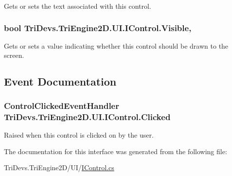 Gets or sets the text associated with this control. 

\hypertarget{interface_tri_devs_1_1_tri_engine2_d_1_1_u_i_1_1_i_control_ac0217db5d8c9b8ee6e226df157aceac6}{
\subsubsection[{Visible}]{\setlength{\rightskip}{0pt plus 5cm}bool Tri\-Devs.\-Tri\-Engine2\-D.\-U\-I.\-I\-Control.\-Visible\hspace{0.3cm}{\ttfamily [get]}, {\ttfamily [set]}}}\label{interface_tri_devs_1_1_tri_engine2_d_1_1_u_i_1_1_i_control_ac0217db5d8c9b8ee6e226df157aceac6}


Gets or sets a value indicating whether this control should be drawn to the screen. 



\subsection{Event Documentation}
\hypertarget{interface_tri_devs_1_1_tri_engine2_d_1_1_u_i_1_1_i_control_a769d812172bdfb85b0d605b843be9593}{
\subsubsection[{Clicked}]{\setlength{\rightskip}{0pt plus 5cm}Control\-Clicked\-Event\-Handler Tri\-Devs.\-Tri\-Engine2\-D.\-U\-I.\-I\-Control.\-Clicked}}\label{interface_tri_devs_1_1_tri_engine2_d_1_1_u_i_1_1_i_control_a769d812172bdfb85b0d605b843be9593}


Raised when this control is clicked on by the user. 



The documentation for this interface was generated from the following file\-:\begin{DoxyCompactItemize}
\item 
Tri\-Devs.\-Tri\-Engine2\-D/\-U\-I/\hyperlink{_i_control_8cs}{I\-Control.\-cs}\end{DoxyCompactItemize}
